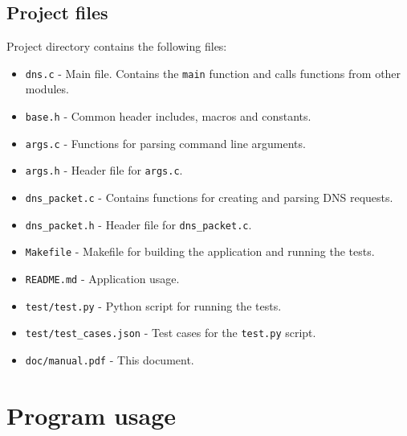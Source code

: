 \documentclass[a4paper, 11pt]{article}
\begin{document}
    \subsection{Project files}
        Project directory contains the following files:
        \begin{itemize}
            \item \texttt{dns.c} - Main file. Contains the \texttt{main} function and calls functions from other modules.
            \item \texttt{base.h} - Common header includes, macros and constants.
            \item \texttt{args.c} - Functions for parsing command line arguments.
            \item \texttt{args.h} - Header file for \texttt{args.c}.
            \item \texttt{dns\_packet.c} - Contains functions for creating and parsing DNS requests.
            \item \texttt{dns\_packet.h} - Header file for \texttt{dns\_packet.c}.
            \item \texttt{Makefile} - Makefile for building the application and running the tests.
            \item \texttt{README.md} - Application usage.
            \item \texttt{test/test.py} - Python script for running the tests.
            \item \texttt{test/test\_cases.json} - Test cases for the \texttt{test.py} script.
            \item \texttt{doc/manual.pdf} - This document.
        \end{itemize}

\section{Program usage}
\end{document}
